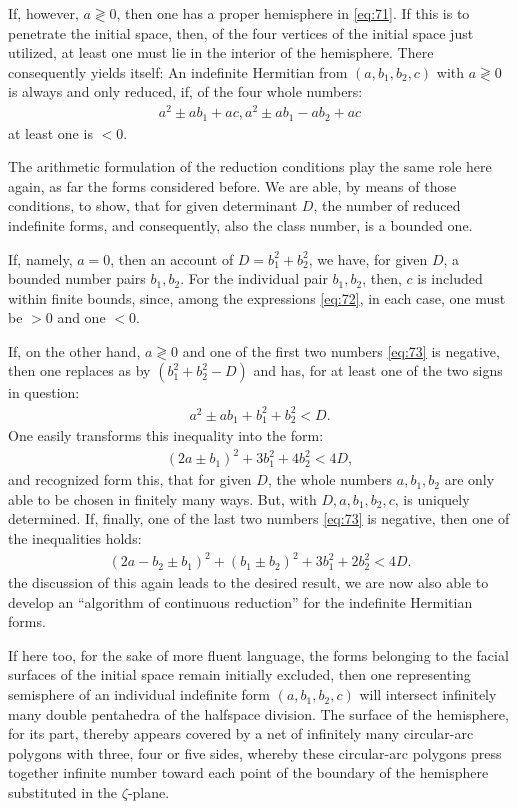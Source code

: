 If, however, $a\gtrless0$, then one has a proper hemisphere in \ref{eq:71}. If this is to penetrate the initial space, then, of the four vertices of the initial space just utilized, at least one must lie in the interior of the hemisphere. There consequently yields itself: An indefinite Hermitian from $(a,b_1,b_2,c)$ with $a\gtrless 0$ is always and only reduced, if, of the four whole numbers:
\begin{align}\label{eq:73}
    a^2\pm ab_1+ac, a^2\pm ab_1-ab_2+ac
\end{align}
at least one is $<0$.

The arithmetic formulation of the reduction conditions play the same role here again, as far the forms considered before. We are able, by means of those conditions, to show, that for given determinant $D$, the number of reduced indefinite forms, and consequently, also the class number, is a bounded one.

If, namely, $a=0$, then an account of $D=b_1^2+b_2^2$, we have, for given $D$, a bounded number pairs $b_1, b_2$. For the individual pair $b_1, b_2$, then, $c$ is included within finite bounds, since, among the expressions \ref{eq:72}, in each case, one must be $>0$ and one $<0$.

If, on the other hand, $a\gtrless 0$ and one of the first two numbers \ref{eq:73} is negative, then one replaces as by $(b_1^2+b_2^2-D)$ and has, for at least one of the two signs in question:
\begin{align}
    a^2\pm ab_1+b_1^2+b_2^2<D.
\end{align}
One easily transforms this inequality into the form:
\begin{align}
    (2a\pm b_1)^2+3b_1^2+4b_2^2<4D,
\end{align}
and recognized form this, that for given $D$, the whole numbers $a, b_1, b_2$ are only able to be chosen in finitely many ways. But, with $D, a, b_1, b_2, c$, is uniquely determined. If, finally, one of the last two numbers \ref{eq:73} is negative, then one of the inequalities holds:
\begin{align}
    (2a-b_2\pm b_1)^2+(b_1\pm b_2)^2+3b_1^2+2b_2^2<4D.
\end{align}
the discussion of this again leads to the desired result, we are now also able to develop an “algorithm of continuous reduction” for the indefinite Hermitian forms.

If here too, for the sake of more fluent language, the forms belonging to the facial surfaces of the initial space remain initially excluded, then one representing semisphere of an individual indefinite form $(a, b_1, b_2, c)$ will intersect infinitely many double pentahedra of the halfspace division. The surface of the hemisphere, for its part, thereby appears covered by a net of infinitely many circular-arc polygons with three, four or five sides, whereby these circular-arc polygons press together infinite number toward each point of the boundary of the hemisphere substituted in the $\zeta$-plane.

